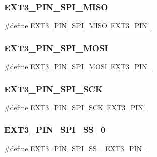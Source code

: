 \subsubsection{\texorpdfstring{EXT3\_PIN\_SPI\_MISO}{EXT3\_PIN\_SPI\_MISO}}
{\footnotesize\ttfamily \#define E\+X\+T3\+\_\+\+P\+I\+N\+\_\+\+S\+P\+I\+\_\+\+M\+I\+SO~\mbox{\hyperlink{group__samd21__xplained__pro__features__group_ga0ebe9b8af5b0961d98f2ac78875f7cc9}{E\+X\+T3\+\_\+\+P\+I\+N\+\_}}}

\mbox{\label{group__samd21__xplained__pro__features__group_ga47222afd21e45970647fec2204a44346}} 
\subsubsection{\texorpdfstring{EXT3\_PIN\_SPI\_MOSI}{EXT3\_PIN\_SPI\_MOSI}}
{\footnotesize\ttfamily \#define E\+X\+T3\+\_\+\+P\+I\+N\+\_\+\+S\+P\+I\+\_\+\+M\+O\+SI~\mbox{\hyperlink{group__samd21__xplained__pro__features__group_ga129b453fa4cdccb3238c96192675c48d}{E\+X\+T3\+\_\+\+P\+I\+N\+\_}}}

\mbox{\label{group__samd21__xplained__pro__features__group_gaef6c5a494b75787ab10a3c23c82488c9}} 
\subsubsection{\texorpdfstring{EXT3\_PIN\_SPI\_SCK}{EXT3\_PIN\_SPI\_SCK}}
{\footnotesize\ttfamily \#define E\+X\+T3\+\_\+\+P\+I\+N\+\_\+\+S\+P\+I\+\_\+\+S\+CK~\mbox{\hyperlink{group__samd21__xplained__pro__features__group_gab13aa81d23765b5ba889f25b46db936e}{E\+X\+T3\+\_\+\+P\+I\+N\+\_}}}

\mbox{\label{group__samd21__xplained__pro__features__group_ga82dbbc309a4eda1598ed614f6767976a}} 
\subsubsection{\texorpdfstring{EXT3\_PIN\_SPI\_SS\_0}{EXT3\_PIN\_SPI\_SS\_0}}
{\footnotesize\ttfamily \#define E\+X\+T3\+\_\+\+P\+I\+N\+\_\+\+S\+P\+I\+\_\+\+S\+S\+\_~\mbox{\hyperlink{group__samd21__xplained__pro__features__group_ga02135878edc582d48eec8a2898f14eaa}{E\+X\+T3\+\_\+\+P\+I\+N\+\_}}}

